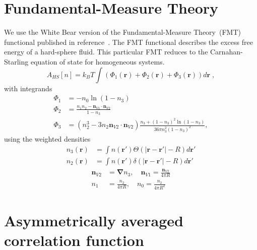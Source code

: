 \documentclass[letterpaper,twocolumn,amsmath,amssymb,jcp,10pt,aip]{revtex4-1}
\newcommand{\rr}{\textbf{r}}
\newcommand{\derivation}[1]{} %
\begin{document}
\section{Fundamental-Measure Theory}

We use the White Bear version of the Fundamental-Measure Theory~(FMT)
functional published in reference~\cite{roth2002whitebear}.  The FMT
functional describes the excess free energy of a hard-sphere fluid.
This particular FMT reduces to the Carnahan-Starling equation of state
for homogeneous systems.
\begin{equation}
A_\textit{HS}[n] = k_B T \int \left(\Phi_1(\rr) + \Phi_2(\rr) + \Phi_3(\rr)\right) d\rr \; ,
\end{equation}
with integrands
\begin{align}
\Phi_1 &= -n_0 \ln\left( 1 - n_3\right)\\
\Phi_2 &= \frac{n_1 n_2 - \mathbf{n}_{V1} \cdot\mathbf{n}_{V2}}{1-n_3} \\
\Phi_3 &= (n_2^3 - 3 n_2 \mathbf{n}_{V2} \cdot \mathbf{n}_{V2}) \frac{
  n_3 + (1-n_3)^2 \ln(1-n_3)
}{
  36\pi n_3^2\left( 1 - n_3 \right)^2
} ,
\end{align}
using the weighted densities
\begin{align}
  n_3(\rr) &= \int n(\rr') \Theta(\left|\rr - \rr'\right| - R) d\rr' \\
  n_2(\rr) &= \int n(\rr') \delta(\left|\rr - \rr'\right| - R) d\rr'
\end{align}
\begin{align}
  \mathbf{n}_{V2} &= \mathbf{\nabla} n_3 , \quad
  \mathbf{n}_{V1} = \frac{\mathbf{n}_{V2}}{4\pi R} \\
  n_1 &= \frac{n_2}{4\pi R} , \quad
  n_0 = \frac{n_2}{4\pi R^2}
\end{align}


\derivation{
  \begin{widetext}
}




\section{Asymmetrically averaged correlation function}\label{sec:g-A}
\end{document}
